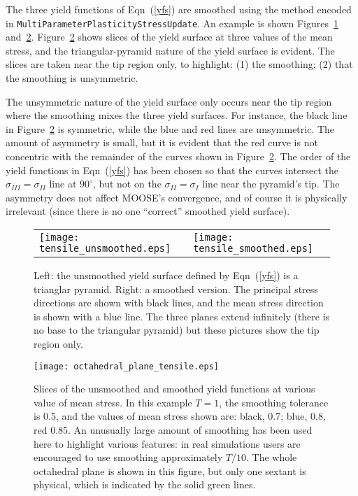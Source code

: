 \documentclass[]{scrreprt}
\begin{document}
The three yield functions of Eqn~(\ref{yfs}) are smoothed using the
method encoded in {\tt MultiParameterPlasticityStressUpdate}.  An
example is shown Figures~\ref{tensile_3D.fig}
and~\ref{tensile_oct.fig}.  Figure~\ref{tensile_oct.fig} shows slices
of the yield surface at three values of the mean stress, and the
triangular-pyramid nature of the yield surface is evident.  The slices
are taken near the tip region only, to highlight: (1) the smoothing;
(2) that the smoothing is unsymmetric.

The unsymmetric nature of the
yield surface only occurs near the tip region where the smoothing
mixes the three yield surfaces.  For instance, the black line in
Figure~\ref{tensile_oct.fig} is symmetric, while the blue and red
lines are unsymmetric.  The amount of asymmetry is small, but it is
evident that the red curve is not concentric with the remainder of the
curves shown in Figure~\ref{tensile_oct.fig}.  The order of the yield
functions in Eqn~(\ref{yfs}) has been chosen so that the curves
intersect the $\sigma_{III}=\sigma_{II}$ line at $90^{\circ}$, but not
on the $\sigma_{II}=\sigma_{I}$ line near the pyramid's tip.  The
asymmetry does not affect MOOSE's convergence, and of course it is
physically irrelevant (since there is no one ``correct'' smoothed
yield surface).

\begin{figure}[htb]
  \begin{center}
    \begin{tabular}{ll}
\texttt{[image: tensile\_unsmoothed.eps]} &
\texttt{[image: tensile\_smoothed.eps]}
    \end{tabular}
\caption{Left: the unsmoothed yield surface defined by
  Eqn~(\ref{yfs}) is a trianglar pyramid.  Right: a smoothed version.  The principal stress
  directions are shown with black lines, and the mean stress direction
  is shown with a blue line.  The three planes extend infinitely
  (there is no base to the triangular pyramid) but these pictures show
  the tip region only.}
\label{tensile_3D.fig}
\end{center}
\end{figure}

\begin{figure}[htb]
  \begin{center}
\texttt{[image: octahedral\_plane\_tensile.eps]}
\caption{Slices of the unsmoothed and smoothed yield functions at
  various value of mean stress.  In this example $T=1$, the smoothing
  tolerance is 0.5, and the values of mean stress shown are: black,
  0.7; blue, 0.8, red 0.85.  An unusually large amount of smoothing
  has been used here to highlight various features: in real
  simulations users are encouraged to use smoothing approximately
  $T/10$.  The whole octahedral plane is shown in this figure, but
  only one sextant is physical, which is indicated by the solid green
  lines.}
\label{tensile_oct.fig}
\end{center}
\end{figure}
\end{document}
